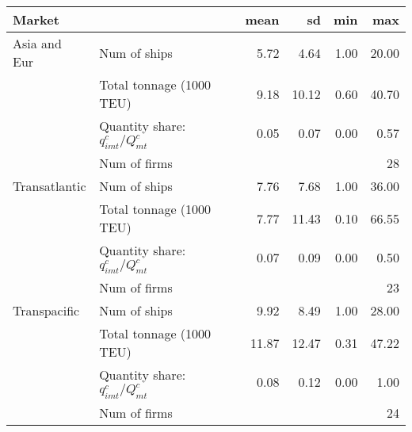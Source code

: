 
\begin{tabular}[t]{llrrrr}
\toprule
Market &   & mean & sd & min & max\\
\midrule
Asia and Eur & Num of ships & 5.72 & 4.64 & 1.00 & 20.00\\
 & Total tonnage (1000 TEU) & 9.18 & 10.12 & 0.60 & 40.70\\
 & Quantity share: $q_{imt}^c/Q_{mt}^c$ & 0.05 & 0.07 & 0.00 & 0.57\\
 & Num of firms &  &  &  & 28\\
Transatlantic & Num of ships & 7.76 & 7.68 & 1.00 & 36.00\\
 & Total tonnage (1000 TEU) & 7.77 & 11.43 & 0.10 & 66.55\\
 & Quantity share: $q_{imt}^c/Q_{mt}^c$ & 0.07 & 0.09 & 0.00 & 0.50\\
 & Num of firms &  &  &  & 23\\
Transpacific & Num of ships & 9.92 & 8.49 & 1.00 & 28.00\\
 & Total tonnage (1000 TEU) & 11.87 & 12.47 & 0.31 & 47.22\\
 & Quantity share: $q_{imt}^c/Q_{mt}^c$ & 0.08 & 0.12 & 0.00 & 1.00\\
 & Num of firms &  &  &  & 24\\
\bottomrule
\end{tabular}
